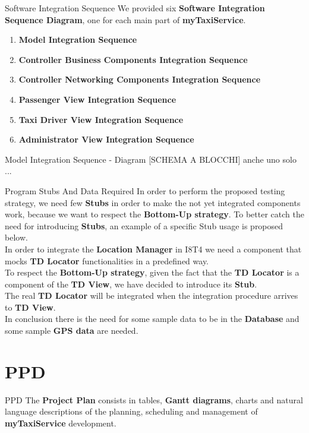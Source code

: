\documentclass{../common/latex_classes/pdf_presentation}
\begin{document}
	\begin{frame}{Software Integration Sequence}
		We provided six \textbf{Software Integration Sequence Diagram}, one for each main part of \textbf{myTaxiService}.
		\begin{enumerate}
			\item \textbf{Model Integration Sequence}
			\item \textbf{Controller Business Components Integration Sequence}
			\item \textbf{Controller Networking Components Integration Sequence}
			\item \textbf{Passenger View Integration Sequence}
			\item \textbf{Taxi Driver View Integration Sequence}
			\item \textbf{Administrator View Integration Sequence}
		\end{enumerate}
	\end{frame}
	\begin{frame}{Model Integration Sequence - Diagram}
		[SCHEMA A BLOCCHI] anche uno solo ...
	\end{frame}
	\begin{frame}{Program Stubs And Data Required}
		In order to perform the proposed testing strategy, we need few \textbf{Stubs} in order to make the not yet integrated components work, because we want to respect the \textbf{Bottom-Up strategy}.
		\medskip
		To better catch the need for introducing \textbf{Stubs}, an example of a specific Stub usage is proposed below.\\
		In order to integrate the \textbf{Location Manager} in I8T4 we need a component that mocks \textbf{TD Locator} functionalities in a predefined way. \\
		To respect the \textbf{Bottom-Up strategy}, given the fact that the \textbf{TD Locator} is a component of the \textbf{TD View}, we have decided to introduce its \textbf{Stub}. \\
		The real \textbf{TD Locator} will be integrated when the integration procedure arrives to \textbf{TD View}.\\
		\medskip
		In conclusion there is the need for some sample data to be in the \textbf{Database} and some sample \textbf{GPS data} are needed.
	\end{frame}
	\section{PPD}
	\begin{frame}{PPD}
		The \textbf{Project Plan} consists in tables, \textbf{Gantt diagrams}, charts and natural language descriptions of the planning, scheduling and management of \textbf{myTaxiService} development.
	\end{frame}
\end{document}
